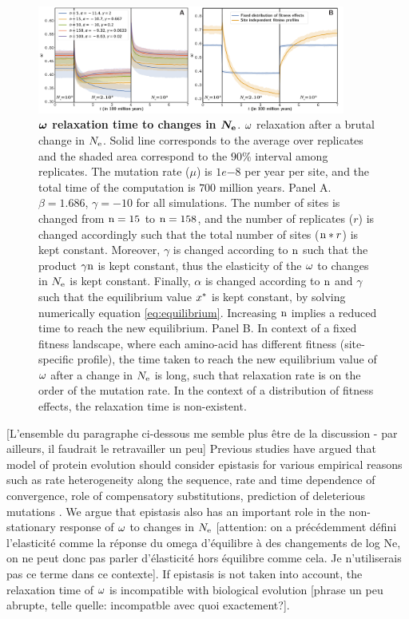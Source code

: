 \documentclass{article}
\begin{document}
	\begin{figure}[htb!]
		\begin{mdframed}
			\centering
			\includegraphics[width=0.9\textwidth] {artworks/Relaxation.pdf}
			\caption{
				\textbf{$\bm{\omega}$ relaxation time to changes in $\bm{N_{\mathrm{e}}}$}.
				$\omega$ relaxation after a brutal change in $N_{\mathrm{e}}$.
				Solid line corresponds to the average over replicates and the shaded area correspond to the $90\%$ interval among replicates. 
				The mutation rate ($\mu$) is $1e{-8}$ per year per site, and the total time of the computation is $700$ million years.
				Panel A. $\beta=1.686$, $\gamma=-10$ for all simulations. The number of sites is changed from $\text{n}=15$ to $\text{n}=158$, and the number of replicates ($r$) is changed accordingly such that the total number of sites ($\text{n}*r$) is kept constant.
				Moreover, $\gamma$ is changed according to $\text{n}$ such that the product $\gamma\text{n}$ is kept constant, thus the elasticity of the $\omega$ to changes in $N_{\mathrm{e}}$ is kept constant.
				Finally, $\alpha$ is changed according to $\text{n}$ and $\gamma$ such that the equilibrium value $x^{*}$ is kept constant, by solving numerically equation \ref{eq:equilibrium}.
				Increasing $\text{n}$ implies a reduced time to reach the new equilibrium.
				Panel B. In context of a fixed fitness landscape, where each amino-acid has different fitness (site-specific profile), the time taken to reach the new equilibrium value of $\omega$ after a change in $N_{\mathrm{e}}$ is long, such that relaxation rate is on the order of the mutation rate. In the context of a distribution of fitness effects, the relaxation time is non-existent.
			}
			\label{fig:relaxStability}
		\end{mdframed}
	\end{figure}
	
	[L'ensemble du paragraphe ci-dessous me semble plus être de la discussion - par ailleurs, il faudrait le retravailler un peu]
	Previous studies have argued that model of protein evolution should consider epistasis for various empirical reasons such as rate heterogeneity along the sequence, rate and time dependence of convergence, role of compensatory substitutions, prediction of deleterious mutations \cite{Goldstein2017}.
	We argue that epistasis also has an important role in the non-stationary response of $\omega$ to changes in $N_{\mathrm{e}}$ [attention: on a précédemment défini l'elasticité comme la réponse du omega d'équilibre à des changements de log Ne, on ne peut donc pas parler d'élasticité hors équilibre comme cela. Je n'utiliserais pas ce terme dans ce contexte].
	If epistasis is not taken into account, the relaxation time of $\omega$ is incompatible with biological evolution [phrase un peu abrupte, telle quelle: incompatble avec quoi exactement?].
	
\end{document}
